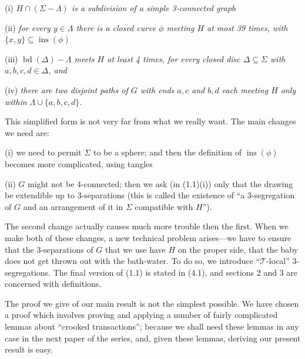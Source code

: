 \hspace*{12pt}(i) \textit{$H \cap (\Sigma - \Lambda)$ is a subdivision of a simple 3-connected graph}

\hspace*{12pt}(ii) \textit{for every $y \in \Lambda$ there is a closed curve $\phi$ meeting $H$ at most 39 times, with $\{x, y\} \subseteq \operatorname{ins}(\phi)$}

\hspace*{12pt}(iii) \textit{$\operatorname{bd}(\Delta) - \Lambda$ meets $H$ at least 4 times, for every closed disc $\Delta \subseteq \Sigma$ with $a, b, c, d \in \Delta$, and}

\hspace*{12pt}(iv) \textit{there are two disjoint paths of $G$ with ends $a, c$ and $b, d$ each meeting $H$ only within $\Lambda \cup \{a, b, c, d\}$.}

This simplified form is not very far from what we really want. The main changes we need are:

\hspace*{12pt}(i) we need to permit $\Sigma$ to be a sphere; and then the definition of $\operatorname{ins}(\phi)$ becomes more complicated, using tangles

\hspace*{12pt}(ii) $G$ might not be 4-connected; then we ask (in (1.1)(i)) only that the drawing be extendible up to 3-separations (this is called the existence of ``a 3-segregation of $G$ and an arrangement of it in $\Sigma$ compatible with $H$'').

The second change actually causes much more trouble then the first. When we make both of these changes, a new technical problem arises---we have to ensure that the 3-separations of $G$ that we use have $H$ on the proper side, that the baby does not get thrown out with the bath-water. To do so, we introduce ``$\mathscr{T}$-local'' 3-segregations. The final version of (1.1) is stated in (4.1), and sections 2 and 3 are concerned with definitions.

The proof we give of our main result is not the simplest possible. We have chosen a proof which involves proving and applying a number of fairly complicated lemmas about ``crooked transactions''; because we shall need these lemmas in any case in the next paper of the series, and, given these lemmas, deriving our present result is easy.


